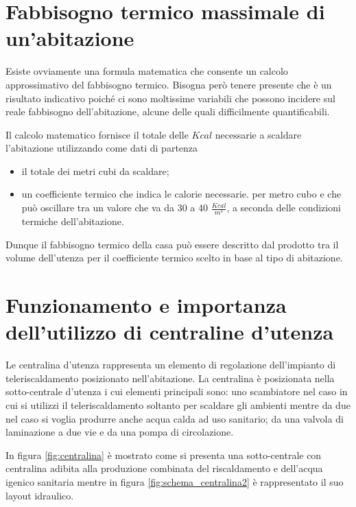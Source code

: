 \documentclass[laurea,oneside,11pt]{USiena_tesiLM}
\begin{document}
\section{Fabbisogno termico massimale di un'abitazione}
Esiste ovviamente una formula matematica che consente un calcolo approssimativo del fabbisogno termico. Bisogna però tenere presente che è  un risultato indicativo poiché ci sono moltissime variabili che possono incidere sul reale fabbisogno dell'abitazione, alcune delle quali difficilmente quantificabili. 

Il calcolo matematico fornisce il totale delle $Kcal$ necessarie a scaldare l'abitazione utilizzando come dati di partenza
\begin{itemize}
\item  il totale dei metri cubi da scaldare;
\item  un coefficiente termico che indica le calorie necessarie. per metro cubo e che può  oscillare tra un valore che va da 30 a 40 $\frac{Kcal}{m^3}$, a seconda delle condizioni termiche dell'abitazione.
\end{itemize}
Dunque il fabbisogno termico della casa può essere descritto dal prodotto tra il volume dell'utenza per il coefficiente termico scelto in base al tipo di abitazione.



\section{Funzionamento e importanza dell'utilizzo di centraline d'utenza}
\label{sec:centraline}
Le centralina d'utenza rappresenta un elemento di regolazione dell'impianto di teleriscaldamento posizionato nell'abitazione. La centralina è posizionata nella sotto-centrale d'utenza i cui elementi principali sono: uno scambiatore nel caso in cui si utilizzi il teleriscaldamento soltanto per scaldare gli ambienti mentre da due nel caso si voglia produrre anche acqua calda ad uso sanitario; da una valvola di laminazione a due vie e da una pompa di circolazione. 

In figura \ref{fig:centralina} è mostrato come si presenta una sotto-centrale con centralina adibita alla produzione combinata del riscaldamento e dell'acqua igenico sanitaria mentre in figura \ref{fig:schema_centralina2} è rappresentato il suo layout idraulico.
\end{document}
